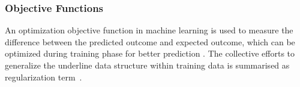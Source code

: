 \subsubsection{Objective Functions}
An optimization objective function in machine learning is used to measure the difference between the predicted outcome and expected outcome, which can be optimized during training phase for better prediction . The collective efforts to generalize the underline data structure within training data is summarised as regularization term~\cite{goodfellow_2015}.  